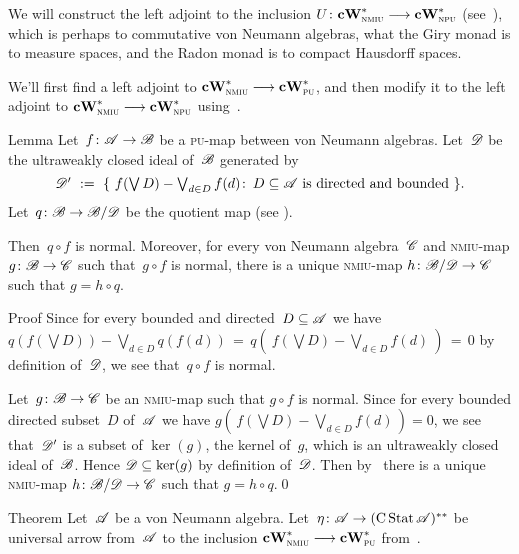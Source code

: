 \documentclass[a]{subfiles}
\begin{document}
\begin{parsec}%
\begin{point}%
We will construct the left adjoint
to the inclusion $U\colon \mathbf{cW}^*_{\text{\textsc{nmiu}}}\longrightarrow \mathbf{cW}^*_{\text{\textsc{npu}}}$
(see~),
which 
is perhaps to commutative von Neumann algebras,
what the Giry monad is to  measure spaces,
and the Radon monad is to compact Hausdorff spaces.

We'll first find a left adjoint to $\mathbf{cW}^*_{\text{\textsc{nmiu}}}\longrightarrow \mathbf{cW}^*_{\text{\textsc{pu}}}$,
and then modify it
to the left adjoint to $\mathbf{cW}^*_{\text{\textsc{nmiu}}}\longrightarrow \mathbf{cW}^*_{\text{\textsc{npu}}}$
using~.
\end{point}
\begin{point}{Lemma}%
Let~$f\colon \mathscr{A}\to\mathscr{B}$
be a \textsc{pu}-map between
von Neumann algebras.
Let~$\mathscr{D}$ be the ultraweakly closed ideal of~$\mathscr{B}$
generated by
\begin{equation*}
\textstyle
\mathscr{D}' \ :=\ \{\ f(\bigvee D)-\bigvee_{d\in D}f(d)\colon \, 
D\subseteq \mathscr{A}\text{ is directed and bounded}\ \}.
\end{equation*}
Let~$q\colon \mathscr{B}\to \mathscr{B}/\mathscr{D}$ be the quotient
map (see ).

Then~$q\circ f$ is normal.
Moreover,
for every von Neumann algebra~$\mathscr{C}$
and \textsc{nmiu}-map $g\colon \mathscr{B}\to \mathscr{C}$
such that~$g\circ f$ is normal,
there is a unique \textsc{nmiu}-map $h\colon \mathscr{B}/\mathscr{D}\to \mathscr{C}$
such that $g=h \circ q$.
\begin{point}{Proof}%
Since for every bounded and directed~$D\subseteq \mathscr{A}$
we have
$q(f(\bigvee D)) - \bigvee_{d\in D}q(f(d))
\,=\, q(\ f(\bigvee D)-\bigvee_{d\in D}f(d)\ ) \,=\, 0$
by definition of~$\mathscr{D}$,
we see that~$q\circ f$ is normal.
\end{point}
\begin{point}%
Let~$g\colon \mathscr{B}\to \mathscr{C}$ be an \textsc{nmiu}-map
such that $g\circ f$ is normal.
Since for every bounded directed subset~$D$ of~$\mathscr{A}$
we have $g(\,f(\bigvee D)-\bigvee_{d\in D}f(d)\,)=0$,
we see that~$\mathscr{D}'$ is a subset of $\ker(g)$, the kernel of~$g$,
which is an ultraweakly closed ideal of~$\mathscr{B}$.
Hence $\mathscr{D}\subseteq \ker(g)$ by definition of~$\mathscr{D}$.
Then by~
there is a unique \textsc{nmiu}-map $h\colon \mathscr{B}/\mathscr{D}\to \mathscr{C}$
such that $g=h\circ q$.\qed
\end{point}
\end{point}
\begin{point}[cw-giry]{Theorem}%
Let~$\mathscr{A}$ be a von Neumann algebra.
Let~$\eta\colon\mathscr{A}\to (\operatorname{C}\operatorname{Stat}\mathscr{A})^{**}$
be universal arrow from~$\mathscr{A}$ to
the inclusion $\mathbf{cW}^*_{\text{\textsc{nmiu}}}\longrightarrow \mathbf{cW}^*_{\text{\textsc{pu}}}$
from~.


\end{point}
\end{parsec}
\end{document}
